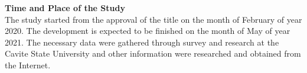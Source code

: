 \flushleft
\textbf{Time and Place of the Study}\\
\justifying
\parx
The study started from the approval of the title on the month of February of year
2020. The development is expected to be finished on the month of May of year
2021. The necessary data were gathered through survey and research at the Cavite
State University and other information were researched and obtained from the
Internet.\\
